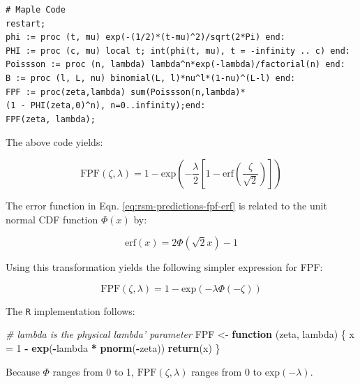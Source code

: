 \documentclass[
]{book}
\newenvironment{Shaded}{\begin{snugshade}}{\end{snugshade}}
\newcommand{\CommentTok}[1]{\textcolor[rgb]{0.56,0.35,0.01}{\textit{#1}}}
\newcommand{\ControlFlowTok}[1]{\textcolor[rgb]{0.13,0.29,0.53}{\textbf{#1}}}
\newcommand{\DecValTok}[1]{\textcolor[rgb]{0.00,0.00,0.81}{#1}}
\newcommand{\KeywordTok}[1]{\textcolor[rgb]{0.13,0.29,0.53}{\textbf{#1}}}
\newcommand{\NormalTok}[1]{#1}
\newcommand{\OperatorTok}[1]{\textcolor[rgb]{0.81,0.36,0.00}{\textbf{#1}}}
\newcommand{\StringTok}[1]{\textcolor[rgb]{0.31,0.60,0.02}{#1}}
\begin{document}
\begin{verbatim}
# Maple Code
restart;
phi := proc (t, mu) exp(-(1/2)*(t-mu)^2)/sqrt(2*Pi) end: 
PHI := proc (c, mu) local t; int(phi(t, mu), t = -infinity .. c) end: 
Poissson := proc (n, lambda) lambda^n*exp(-lambda)/factorial(n) end: 
B := proc (l, L, nu) binomial(L, l)*nu^l*(1-nu)^(L-l) end:
FPF := proc(zeta,lambda) sum(Poissson(n,lambda)*
(1 - PHI(zeta,0)^n), n=0..infinity);end:
FPF(zeta, lambda);   
\end{verbatim}

The above code yields:

\begin{equation}
\text{FPF}\left (\zeta , \lambda\right ) = 1 - \text{exp}\left ( -\frac{\lambda}{2} \left [ 1-\text{erf}\left ( \frac{\zeta}{\sqrt{2}} \right ) \right ]  \right ) 
\label{eq:rsm-predictions-fpf-erf}
\end{equation}

The error function in Eqn. \eqref{eq:rsm-predictions-fpf-erf} is related to the unit normal CDF function \(\Phi(x)\) by:

\begin{equation}
\text{erf} \left (x \right ) =  2\Phi \left ( \sqrt{2} x\right ) - 1
\label{eq:rsm-predictions-erf-phi-relation}
\end{equation}

Using this transformation yields the following simpler expression for FPF:

\begin{equation}
\text{FPF}\left (\zeta , \lambda\right ) = 1 - \text{exp}\left ( -\lambda \Phi\left ( -\zeta \right )  \right )
\label{eq:rsm-predictions-fpf}
\end{equation}

The \texttt{R} implementation follows:

\begin{Shaded}
\begin{Highlighting}[]
\CommentTok{# lambda is the physical lambda' parameter}
\NormalTok{FPF <-}\StringTok{ }\ControlFlowTok{function}\NormalTok{ (zeta, lambda) \{}
\NormalTok{  x =}\StringTok{ }\DecValTok{1} \OperatorTok{-}\StringTok{ }\KeywordTok{exp}\NormalTok{(}\OperatorTok{-}\NormalTok{lambda }\OperatorTok{*}\StringTok{ }\KeywordTok{pnorm}\NormalTok{(}\OperatorTok{-}\NormalTok{zeta))}
  \KeywordTok{return}\NormalTok{(x)}
\NormalTok{\}}
\end{Highlighting}
\end{Shaded}

Because \(\Phi\) ranges from 0 to 1, \(\text{FPF}\left (\zeta , \lambda\right )\) ranges from 0 to \(\text{exp} \left ( -\lambda \right )\).
\end{document}
